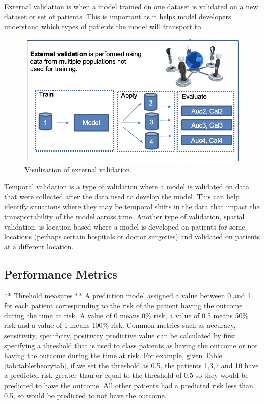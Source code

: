 \documentclass[11pt]{book}
\begin{document}
External validation is when a model trained on one dataset is validated
on a new dataset or set of patients. This is important as it helps model
developers understand which types of patients the model will transport
to.

\begin{figure}
\includegraphics[width=1\linewidth]{images/PatientLevelPrediction/theory/externalValidation} \caption{Visulisation of external validation.}\label{fig:figuretheoryextval}
\end{figure}

Temporal validation is a type of validation where a model is validated
on data that were collected after the data used to develop the model.
This can help identify situations where they may be temporal shifts in
the data that impact the transportability of the model across time.
Another type of validation, spatial validation, is location based where
a model is developed on patients for some locations (perhaps certain
hospitals or doctor surgeries) and validated on patients at a different
location.

\hypertarget{performance}{\subsection{Performance
Metrics}\label{performance}}

** Threhold measures ** A prediction model assigned a value between 0
and 1 for each patient corresponding to the risk of the patient having
the outcome during the time at risk. A value of 0 means 0\% risk, a
value of 0.5 means 50\% risk and a value of 1 means 100\% risk. Common
metrics such as accuracy, sensitivity, specificity, positivity
predictive value can be calculated by first specifying a threshold that
is used to class patients as having the outcome or not having the
outcome during the time at risk. For example, given Table
\ref{tab:tabletheorytab}, if we set the threshold as 0.5, the patients
1,3,7 and 10 have a predicted risk greater than or equal to the
threshold of 0.5 so they would be predicted to have the outcome. All
other patients had a predicted risk less than 0.5, so would be predicted
to not have the outcome.
\end{document}
